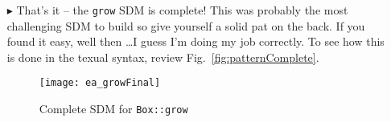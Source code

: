 \begin{itemize}
\vspace{0.5cm}

\item[$\blacktriangleright$]  That's it -- the \texttt{grow} SDM is complete! This was probably the most challenging SDM to build so give yourself a solid 
pat on the back. If you found it easy, well then \ldots I guess I'm doing my job correctly. To see how this is done in the texual syntax, review
Fig.~\ref{fig:patternComplete}.

\vspace{0.5cm}

\begin{figure}[htbp]
\begin{center}
  \texttt{[image: ea\_growFinal]}
  \caption{Complete SDM for \texttt{Box::grow}}  
  \label{fig:growComplete}
\end{center}
\end{figure}
\FloatBarrier


\end{itemize}
